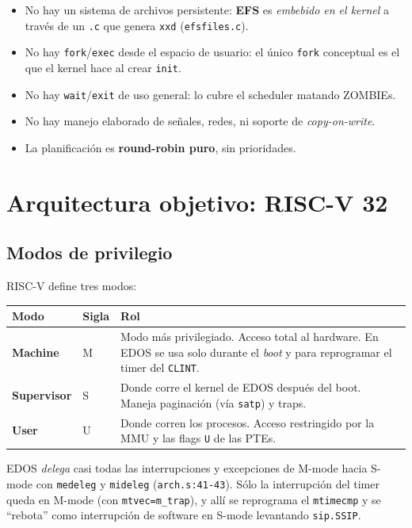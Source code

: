 \documentclass[11pt,a4paper]{article}
\begin{document}
\begin{itemize}[leftmargin=*,nosep]
    \item No hay un sistema de archivos persistente: \textbf{EFS}
        es \emph{embebido en el kernel} a través de un \texttt{.c}
        que genera \texttt{xxd} (\texttt{efsfiles.c}).
    \item No hay \texttt{fork}/\texttt{exec} desde el espacio de
        usuario: el único \texttt{fork} conceptual es el que el
        kernel hace al crear \texttt{init}.
    \item No hay \texttt{wait}/\texttt{exit} de uso general: lo
        cubre el scheduler matando ZOMBIEs.
    \item No hay manejo elaborado de señales, redes, ni soporte de
        \emph{copy-on-write}.
    \item La planificación es \textbf{round-robin puro}, sin
        prioridades.
\end{itemize}

\section{Arquitectura objetivo: RISC-V 32}

\subsection{Modos de privilegio}

RISC-V define tres modos:

\begin{center}
\small
\begin{tabular}{@{}llp{8.5cm}@{}}
\toprule
Modo & Sigla & Rol \\
\midrule
\textbf{Machine}    & M & Modo más privilegiado. Acceso total al hardware. En EDOS se usa solo durante el \emph{boot} y para reprogramar el timer del \texttt{CLINT}. \\
\textbf{Supervisor} & S & Donde corre el kernel de EDOS después del boot. Maneja paginación (vía \texttt{satp}) y traps. \\
\textbf{User}       & U & Donde corren los procesos. Acceso restringido por la MMU y las flags \texttt{U} de las PTEs. \\
\bottomrule
\end{tabular}
\end{center}

EDOS \emph{delega} casi todas las interrupciones y excepciones de
M-mode hacia S-mode con \texttt{medeleg} y \texttt{mideleg}
(\texttt{arch.s:41-43}). Sólo la interrupción del timer queda en
M-mode (con \texttt{mtvec=m\_trap}), y allí se reprograma el
\texttt{mtimecmp} y se ``rebota'' como interrupción de software en
S-mode levantando \texttt{sip.SSIP}.
\end{document}
